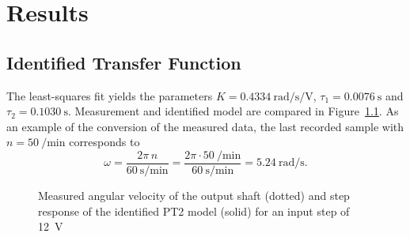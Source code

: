 \chapter{Results}\label{ch:results}

\section{Identified Transfer Function}\label{sec:res-identification}
The least-squares fit yields the parameters
$K = \qty{0.4334}{\radian\per\second\per\volt}$,
$\tau_1 = \qty{0.0076}{\second}$ and $\tau_2 = \qty{0.1030}{\second}$.
Measurement and identified model are compared in
Figure~\ref{fig:identification}. As an example of the conversion of the
measured data, the last recorded sample with $n = \qty{50}{\per\minute}$
corresponds to
\begin{equation*}
  \omega = \frac{2\pi\,n}{\qty{60}{\second\per\minute}}
  = \frac{2\pi \cdot \qty{50}{\per\minute}}{\qty{60}{\second\per\minute}}
  = \qty{5.24}{\radian\per\second}.
\end{equation*}

\begin{figure}[H]
  \centering
  \caption[Measured and identified step response]{Measured angular velocity of
    the output shaft (dotted) and step response of the identified PT2 model
    (solid) for an input step of \qty{12}{\volt}}
  \label{fig:identification}
\end{figure}

